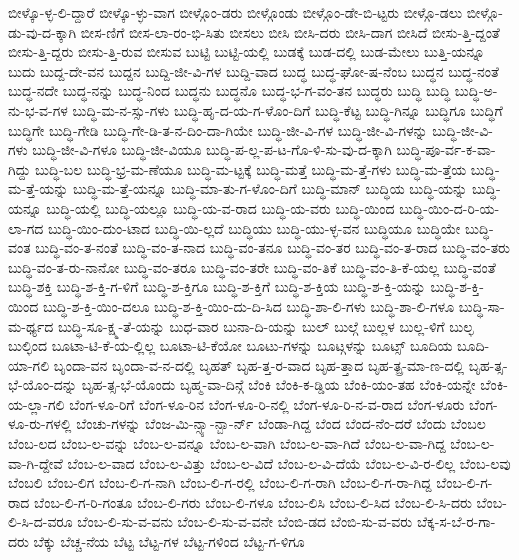 {ಬೀಳ್ಕೊ-ಳ್ಳ-ಲಿ-ದ್ದಾರೆ
ಬೀಳ್ಕೊ-ಳ್ಳು-ವಾಗ
ಬೀಳ್ಗೊಂ-ಡರು
ಬೀಳ್ಗೊಂಡು
ಬೀಳ್ಗೊಂ-ಡೇ-ಬಿ-ಟ್ಟರು
ಬೀಳ್ಗೊ-ಡಲು
ಬೀಳ್ಗೊ-ಡು-ವು-ದ-ಕ್ಕಾಗಿ
ಬೀಸ-ಣಿಗೆ
ಬೀಸ-ಲಾ-ರಂ-ಭಿ-ಸಿತು
ಬೀಸಲು
ಬೀಸಿ
ಬೀಸಿ-ದರು
ಬೀಸಿ-ದಾಗ
ಬೀಸಿದೆ
ಬೀಸು-ತ್ತಿ-ದ್ದಂತೆ
ಬೀಸು-ತ್ತಿ-ದ್ದರು
ಬೀಸು-ತ್ತಿ-ರುವ
ಬೀಸುವ
ಬುಟ್ಟಿ
ಬುಟ್ಟಿ-ಯಲ್ಲಿ
ಬುಡಕ್ಕೆ
ಬುಡ-ದಲ್ಲಿ
ಬುಡ-ಮೇಲು
ಬುತ್ತಿ-ಯನ್ನೂ
ಬುದು
ಬುದ್ದ-ದೇ-ವನ
ಬುದ್ದನ
ಬುದ್ದಿ-ಜೀ-ವಿ-ಗಳ
ಬುದ್ದಿ-ವಾದ
ಬುದ್ಧ
ಬುದ್ಧ-ಘೋ-ಷ-ನೆಂಬ
ಬುದ್ಧನ
ಬುದ್ಧ-ನಂತೆ
ಬುದ್ಧ-ನದೇ
ಬುದ್ಧ-ನನ್ನು
ಬುದ್ಧ-ನಿಂದ
ಬುದ್ಧನು
ಬುದ್ಧನೊ
ಬುದ್ಧ-ಭ-ಗ-ವಂ-ತನ
ಬುದ್ಧರು
ಬುದ್ಧಿ
ಬುದ್ಧಿ
ಬುದ್ಧಿ-ಅ-ನು-ಭ-ವ-ಗಳ
ಬುದ್ಧಿ-ಮ-ನ-ಸ್ಸು-ಗಳು
ಬುದ್ಧಿ-ಹೃ-ದ-ಯ-ಗ-ಳೊಂ-ದಿಗೆ
ಬುದ್ಧಿ-ಕೆಟ್ಟ
ಬುದ್ಧಿ-ಗಿನ್ನೂ
ಬುದ್ಧಿಗೂ
ಬುದ್ಧಿಗೆ
ಬುದ್ಧಿಗೇ
ಬುದ್ಧಿ-ಗೇಡಿ
ಬುದ್ಧಿ-ಗೇ-ಡಿ-ತ-ನ-ದಿಂ-ದಾ-ಗಿಯೇ
ಬುದ್ಧಿ-ಜೀ-ವಿ-ಗಳ
ಬುದ್ಧಿ-ಜೀ-ವಿ-ಗಳನ್ನು
ಬುದ್ಧಿ-ಜೀ-ವಿ-ಗಳು
ಬುದ್ಧಿ-ಜೀ-ವಿ-ಗಳೂ
ಬುದ್ಧಿ-ಜೀ-ವಿಯೂ
ಬುದ್ಧಿ-ಪ-ಲ್ಲ-ಪ-ಟ-ಗೊ-ಳಿ-ಸು-ವು-ದ-ಕ್ಕಾಗಿ
ಬುದ್ಧಿ-ಪೂ-ರ್ವ-ಕ-ವಾ-ಗಿದ್ದು
ಬುದ್ಧಿ-ಬಲ
ಬುದ್ಧಿ-ಭ್ರ-ಮ-ಣೆಯೂ
ಬುದ್ಧಿ-ಮ-ಟ್ಟಕ್ಕೆ
ಬುದ್ಧಿ-ಮತ್ತೆ
ಬುದ್ಧಿ-ಮ-ತ್ತೆ-ಗಳು
ಬುದ್ಧಿ-ಮ-ತ್ತೆಯ
ಬುದ್ಧಿ-ಮ-ತ್ತೆ-ಯನ್ನು
ಬುದ್ಧಿ-ಮ-ತ್ತೆ-ಯನ್ನೂ
ಬುದ್ಧಿ-ಮಾ-ತು-ಗ-ಳೊಂ-ದಿಗೆ
ಬುದ್ಧಿ-ಮಾನ್
ಬುದ್ಧಿಯ
ಬುದ್ಧಿ-ಯನ್ನು
ಬುದ್ಧಿ-ಯನ್ನೂ
ಬುದ್ಧಿ-ಯಲ್ಲಿ
ಬುದ್ಧಿ-ಯಲ್ಲೂ
ಬುದ್ಧಿ-ಯ-ವ-ರಾದ
ಬುದ್ಧಿ-ಯ-ವರು
ಬುದ್ಧಿ-ಯಿಂದ
ಬುದ್ಧಿ-ಯಿಂ-ದ-ರಿ-ಯ-ಲಾ-ಗದ
ಬುದ್ಧಿ-ಯಿಂ-ದುಂ-ಟಾದ
ಬುದ್ಧಿ-ಯಿ-ಲ್ಲದೆ
ಬುದ್ಧಿಯು
ಬುದ್ಧಿ-ಯು-ಳ್ಳ-ವನ
ಬುದ್ಧಿಯೂ
ಬುದ್ಧಿಯೇ
ಬುದ್ಧಿ-ವಂತ
ಬುದ್ಧಿ-ವಂ-ತ-ನಂತೆ
ಬುದ್ಧಿ-ವಂ-ತ-ನಾದ
ಬುದ್ಧಿ-ವಂ-ತನೂ
ಬುದ್ಧಿ-ವಂ-ತರ
ಬುದ್ಧಿ-ವಂ-ತ-ರಾದ
ಬುದ್ಧಿ-ವಂ-ತರು
ಬುದ್ಧಿ-ವಂ-ತ-ರು-ನಾನೋ
ಬುದ್ಧಿ-ವಂ-ತರೂ
ಬುದ್ಧಿ-ವಂ-ತರೇ
ಬುದ್ಧಿ-ವಂ-ತಿಕೆ
ಬುದ್ಧಿ-ವಂ-ತಿ-ಕೆ-ಯಲ್ಲ
ಬುದ್ಧಿ-ವಂತೆ
ಬುದ್ಧಿ-ಶಕ್ತಿ
ಬುದ್ಧಿ-ಶ-ಕ್ತಿ-ಗ-ಳಿಗೆ
ಬುದ್ಧಿ-ಶ-ಕ್ತಿಗೂ
ಬುದ್ಧಿ-ಶ-ಕ್ತಿಗೆ
ಬುದ್ಧಿ-ಶ-ಕ್ತಿಯ
ಬುದ್ಧಿ-ಶ-ಕ್ತಿ-ಯನ್ನು
ಬುದ್ಧಿ-ಶ-ಕ್ತಿ-ಯಿಂದ
ಬುದ್ಧಿ-ಶ-ಕ್ತಿ-ಯಿಂ-ದಲೂ
ಬುದ್ಧಿ-ಶ-ಕ್ತಿ-ಯಿಂ-ದು-ದಿ-ಸಿದ
ಬುದ್ಧಿ-ಶಾ-ಲಿ-ಗಳು
ಬುದ್ಧಿ-ಶಾ-ಲಿ-ಗಳೂ
ಬುದ್ಧಿ-ಸಾ-ಮ-ರ್ಥ್ಯದ
ಬುದ್ಧಿ-ಸೂ-ಕ್ಷ್ಮ-ತೆ-ಯನ್ನು
ಬುಧ-ವಾರ
ಬುನಾ-ದಿ-ಯನ್ನು
ಬುಲ್
ಬುಲ್ಗೆ
ಬುಲ್ಲಳ
ಬುಲ್ಲ-ಳಿಗೆ
ಬುಲ್ಳ
ಬುಲ್ಳಿಂದ
ಬೂಟಾ-ಟಿ-ಕೆ-ಯ-ಲ್ಲಿಲ್ಲ
ಬೂಟಾ-ಟಿ-ಕೆಯೋ
ಬೂಟು-ಗಳನ್ನು
ಬೂಟ್ಗಳನ್ನು
ಬೂಟ್ಸ್
ಬೂದಿಯ
ಬೂದಿ-ಯಾ-ಗಲಿ
ಬೃಂದಾ-ವನ
ಬೃಂದಾ-ವ-ನ-ದಲ್ಲಿ
ಬೃಹತ್
ಬೃಹ-ತ್ತ-ರ-ವಾದ
ಬೃಹ-ತ್ತಾದ
ಬೃಹ-ತ್ಪ್ರ-ಮಾ-ಣ-ದಲ್ಲಿ
ಬೃಹ-ತ್ಸ-ಭೆ-ಯೊಂ-ದನ್ನು
ಬೃಹ-ತ್ಸ-ಭೆ-ಯೊಂದು
ಬೃಹ್ಮ-ವಾ-ದಿನ್ಗೆ
ಬೆಂಕಿ
ಬೆಂಕಿ-ಕ-ಡ್ಡಿಯ
ಬೆಂಕಿ-ಯಂ-ತಹ
ಬೆಂಕಿ-ಯನ್ನೇ
ಬೆಂಕಿ-ಯ-ಲ್ಲಾ-ಗಲಿ
ಬೆಂಗ-ಳೂ-ರಿಗೆ
ಬೆಂಗ-ಳೂ-ರಿನ
ಬೆಂಗ-ಳೂ-ರಿ-ನಲ್ಲಿ
ಬೆಂಗ-ಳೂ-ರಿ-ನ-ವ-ರಾದ
ಬೆಂಗ-ಳೂರು
ಬೆಂಗ-ಳೂ-ರು-ಗಳಲ್ಲಿ
ಬೆಂಚು-ಗಳನ್ನು
ಬೆಂಜ-ಮಿ-ನ್ಸ್ಯಾ-ನ್ಬಾ-ರ್ನ್
ಬೆಂಡಾ-ಗಿದ್ದ
ಬೆಂದ
ಬೆಂದ-ನೆಂ-ದರೆ
ಬೆಂದು
ಬೆಂಬಲ
ಬೆಂಬ-ಲದ
ಬೆಂಬ-ಲ-ವನ್ನು
ಬೆಂಬ-ಲ-ವನ್ನೂ
ಬೆಂಬ-ಲ-ವಾಗಿ
ಬೆಂಬ-ಲ-ವಾ-ಗಿದೆ
ಬೆಂಬ-ಲ-ವಾ-ಗಿದ್ದ
ಬೆಂಬ-ಲ-ವಾ-ಗಿ-ದ್ದೇವೆ
ಬೆಂಬ-ಲ-ವಾದ
ಬೆಂಬ-ಲ-ವಿತ್ತು
ಬೆಂಬ-ಲ-ವಿದೆ
ಬೆಂಬ-ಲ-ವಿ-ದೆಯೆ
ಬೆಂಬ-ಲ-ವಿ-ರ-ಲಿಲ್ಲ
ಬೆಂಬ-ಲವು
ಬೆಂಬಲಿ
ಬೆಂಬ-ಲಿಗ
ಬೆಂಬ-ಲಿ-ಗ-ನಾಗಿ
ಬೆಂಬ-ಲಿ-ಗ-ರಲ್ಲಿ
ಬೆಂಬ-ಲಿ-ಗ-ರಾಗಿ
ಬೆಂಬ-ಲಿ-ಗ-ರಾ-ಗಿದ್ದ
ಬೆಂಬ-ಲಿ-ಗ-ರಾದ
ಬೆಂಬ-ಲಿ-ಗ-ರಿ-ಗಂತೂ
ಬೆಂಬ-ಲಿ-ಗರು
ಬೆಂಬ-ಲಿ-ಗಳೂ
ಬೆಂಬ-ಲಿಸಿ
ಬೆಂಬ-ಲಿ-ಸಿದ
ಬೆಂಬ-ಲಿ-ಸಿ-ದರು
ಬೆಂಬ-ಲಿ-ಸಿ-ದ-ವರೂ
ಬೆಂಬ-ಲಿ-ಸು-ವ-ವನು
ಬೆಂಬ-ಲಿ-ಸು-ವ-ವನೇ
ಬೆಂಬಿ-ಡದ
ಬೆಂಬಿ-ಸು-ವ-ವರು
ಬೆಕ್ಕ-ಸ-ಬೆ-ರ-ಗಾ-ದರು
ಬೆಕ್ಕು
ಬೆಚ್ಚ-ನೆಯ
ಬೆಟ್ಟ
ಬೆಟ್ಟ-ಗಳ
ಬೆಟ್ಟ-ಗಳಿಂದ
ಬೆಟ್ಟ-ಗ-ಳಿಗೂ
}
